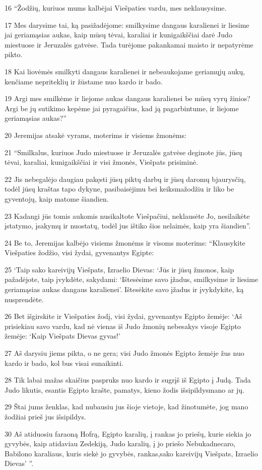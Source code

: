 \par 16 “Žodžių, kuriuos mums kalbėjai Viešpaties vardu, mes neklausysime. 
\par 17 Mes darysime tai, ką pasižadėjome: smilkysime dangaus karalienei ir liesime jai geriamąsias aukas, kaip mūsų tėvai, karaliai ir kunigaikščiai darė Judo miestuose ir Jeruzalės gatvėse. Tada turėjome pakankamai maisto ir nepatyrėme pikto. 
\par 18 Kai liovėmės smilkyti dangaus karalienei ir nebeaukojame geriamųjų aukų, kenčiame nepriteklių ir žūstame nuo kardo ir bado. 
\par 19 Argi mes smilkėme ir liejome aukas dangaus karalienei be mūsų vyrų žinios? Argi be jų sutikimo kepėme jai pyragaičius, kad ją pagarbintume, ir liejome geriamąsias aukas?” 
\par 20 Jeremijas atsakė vyrams, moterims ir visiems žmonėms: 
\par 21 “Smilkalus, kuriuos Judo miestuose ir Jeruzalės gatvėse deginote jūs, jūsų tėvai, karaliai, kunigaikščiai ir visi žmonės, Viešpats prisiminė. 
\par 22 Jis nebegalėjo daugiau pakęsti jūsų piktų darbų ir jūsų daromų bjaurysčių, todėl jūsų kraštas tapo dykyne, pasibaisėjimu bei keiksmažodžiu ir liko be gyventojų, kaip matome šiandien. 
\par 23 Kadangi jūs tomis aukomis nusikaltote Viešpačiui, neklausėte Jo, nesilaikėte įstatymo, įsakymų ir nuostatų, todėl jus ištiko šios nelaimės, kaip yra šiandien”. 
\par 24 Be to, Jeremijas kalbėjo visiems žmonėms ir visoms moterims: “Klausykite Viešpaties žodžio, visi žydai, gyvenantys Egipte: 
\par 25 ‘Taip sako kareivijų Viešpats, Izraelio Dievas: ‘Jūs ir jūsų žmonos, kaip pažadėjote, taip įvykdėte, sakydami: ‘Ištesėsime savo įžadus, smilkysime ir liesime geriamąsias aukas dangaus karalienei’. Ištesėkite savo įžadus ir įvykdykite, ką nusprendėte. 
\par 26 Bet išgirskite ir Viešpaties žodį, visi žydai, gyvenantys Egipto žemėje: ‘Aš prisiekiau savo vardu, kad nė vienas iš Judo žmonių nebesakys visoje Egipto žemėje: ‘Kaip Viešpats Dievas gyvas!’ 
\par 27 Aš darysiu jiems pikta, o ne gera; visi Judo žmonės Egipto žemėje žus nuo kardo ir bado, kol bus visai sunaikinti. 
\par 28 Tik labai mažas skaičius paspruks nuo kardo ir sugrįš iš Egipto į Judą. Tada Judo likutis, esantis Egipto krašte, pamatys, kieno žodis išsipildys­mano ar jų. 
\par 29 Štai jums ženklas, kad nubausiu jus šioje vietoje, kad žinotumėte, jog mano žodžiai prieš jus išsipildys. 
\par 30 Aš atiduosiu faraoną Hofrą, Egipto karalių, į rankas jo priešų, kurie siekia jo gyvybės, kaip atidaviau Zedekiją, Judo karalių, į jo priešo Nebukadnecaro, Babilono karaliaus, kuris siekė jo gyvybės, rankas,­sako kareivijų Viešpats, Izraelio Dievas’ ”.



